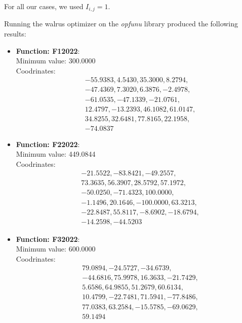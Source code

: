 \documentclass{article}
\begin{document}
For all our cases, we used $I_{i,j} = 1$.

Running the walrus optimizer on the \textit{opfunu} library
produced the following results:

\begin{itemize}
  \item \textbf{Function: F12022}: \\
    Minimum value: 300.0000 \\
    Coodrinates:
    \[
      \begin{aligned}
        & -55.9383, 4.5430, 35.3000, 8.2794, \\
        & -47.4369, 7.3020, 6.3876, -2.4978, \\
        & -61.0535, -47.1339, -21.0761, \\
        & 12.4797, -13.2393, 46.1082, 61.0147, \\
        & 34.8255, 32.6481, 77.8165, 22.1958, \\
        & -74.0837
      \end{aligned}
    \]

  \item \textbf{Function: F22022}: \\
    Minimum value: 449.0844 \\
    Coodrinates:
    \[
      \begin{aligned}
        & -21.5522, -83.8421, -49.2557, \\
        & 73.3635, 56.3907, 28.5792, 57.1972, \\
        & -50.0250, -71.4323, 100.0000, \\
        & -1.1496, 20.1646, -100.0000, 63.3213, \\
        & -22.8487, 55.8117, -8.6902, -18.6794, \\
        & -14.2598, -44.5203
      \end{aligned}
    \]

  \item \textbf{Function: F32022}: \\
    Minimum value: 600.0000 \\
    Coodrinates:
    \[
      \begin{aligned}
        & 79.0894, -24.5727, -34.6739, \\
        & -44.6816, 75.9978, 16.3633, -21.7429, \\
        & 5.6586, 64.9855, 51.2679, 60.6134, \\
        & 10.4799, -22.7481, 71.5941, -77.8486, \\
        & 77.0383, 63.2584, -15.5785, -69.0629, \\
        & 59.1494
      \end{aligned}
    \]


\end{itemize}
\end{document}
